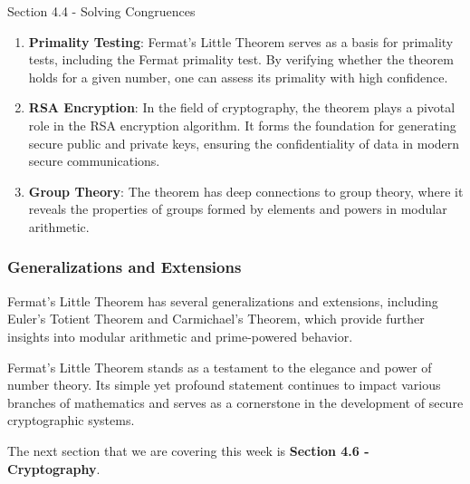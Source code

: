 \begin{notes}{Section 4.4 - Solving Congruences}
    \begin{enumerate}
        \item \textbf{Primality Testing}: Fermat's Little Theorem serves as a basis for primality tests, including the Fermat primality test. By verifying whether the theorem holds for a given 
        number, one can assess its primality with high confidence.
        \item \textbf{RSA Encryption}: In the field of cryptography, the theorem plays a pivotal role in the RSA encryption algorithm. It forms the foundation for generating secure public and 
        private keys, ensuring the confidentiality of data in modern secure communications.
        \item \textbf{Group Theory}: The theorem has deep connections to group theory, where it reveals the properties of groups formed by elements and powers in modular arithmetic.
    \end{enumerate}
    
    \subsubsection*{Generalizations and Extensions}
    
    Fermat's Little Theorem has several generalizations and extensions, including Euler's Totient Theorem and Carmichael's Theorem, which provide further insights into modular arithmetic and prime-powered 
    behavior.
    
    Fermat's Little Theorem stands as a testament to the elegance and power of number theory. Its simple yet profound statement continues to impact various branches of mathematics and serves as a 
    cornerstone in the development of secure cryptographic systems.
\end{notes}

The next section that we are covering this week is \textbf{Section 4.6 - Cryptography}.

